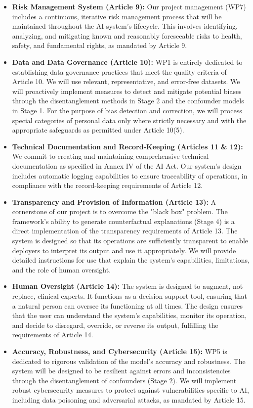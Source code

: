 \documentclass[11pt, a4paper]{article}
\begin{document}
\begin{itemize}
    \item \textbf{Risk Management System (Article 9):} Our project management (WP7) includes a continuous, iterative risk management process that will be maintained throughout the AI system's lifecycle. This involves identifying, analyzing, and mitigating known and reasonably foreseeable risks to health, safety, and fundamental rights, as mandated by Article 9.

    \item \textbf{Data and Data Governance (Article 10):} WP1 is entirely dedicated to establishing data governance practices that meet the quality criteria of Article 10. We will use relevant, representative, and error-free datasets. We will proactively implement measures to detect and mitigate potential biases through the disentanglement methods in Stage 2 and the confounder models in Stage 1. For the purpose of bias detection and correction, we will process special categories of personal data only where strictly necessary and with the appropriate safeguards as permitted under Article 10(5).

    \item \textbf{Technical Documentation and Record-Keeping (Articles 11 \& 12):} We commit to creating and maintaining comprehensive technical documentation as specified in Annex IV of the AI Act. Our system's design includes automatic logging capabilities to ensure traceability of operations, in compliance with the record-keeping requirements of Article 12.

    \item \textbf{Transparency and Provision of Information (Article 13):} A cornerstone of our project is to overcome the "black box" problem. The framework's ability to generate counterfactual explanations (Stage 4) is a direct implementation of the transparency requirements of Article 13. The system is designed so that its operations are sufficiently transparent to enable deployers to interpret its output and use it appropriately. We will provide detailed instructions for use that explain the system's capabilities, limitations, and the role of human oversight.

    \item \textbf{Human Oversight (Article 14):} The system is designed to augment, not replace, clinical experts. It functions as a decision support tool, ensuring that a natural person can oversee its functioning at all times. The design ensures that the user can understand the system's capabilities, monitor its operation, and decide to disregard, override, or reverse its output, fulfilling the requirements of Article 14.

    \item \textbf{Accuracy, Robustness, and Cybersecurity (Article 15):} WP5 is dedicated to rigorous validation of the model's accuracy and robustness. The system will be designed to be resilient against errors and inconsistencies through the disentanglement of confounders (Stage 2). We will implement robust cybersecurity measures to protect against vulnerabilities specific to AI, including data poisoning and adversarial attacks, as mandated by Article 15.
\end{itemize}
\end{document}
